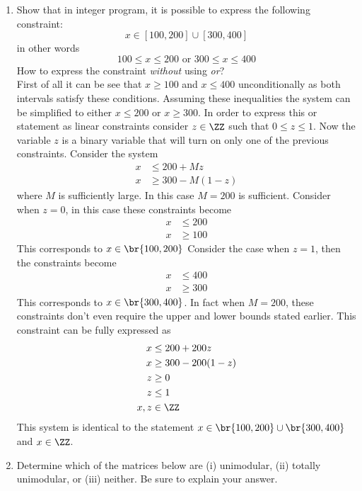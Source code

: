 \documentclass[11pt, oneside]{article}
\begin{document}
\begin{enumerate}
  \item %
    Show that in integer program, it is possible to express the following constraint:
    \[
      x \in [100,200]  \cup [300,400]
    \]
    in other words
    \[
      100 \leq x \leq 200   \text{ or } 300 \leq x \leq 400
    \]
    How to express the constraint \emph{without} using \emph{or}?\\

    First of all it can be see that $x \ge 100$ and $x \le 400$ unconditionally
    as both intervals satisfy these conditions.
    Assuming these inequalities the system can be simplified to
    either $x \le 200$ or $x \ge 300$.
    In order to express this or statement as linear constraints consider
    $z \in \ZZ$ such that $0 \le z \le 1$.
    Now the variable $z$ is a binary variable that will turn on only one
    of the previous constraints.
    Consider the system
    \begin{align*}
      x &\le 200 + Mz \\
      x &\ge 300 - M(1 - z)
    \end{align*}
    where $M$ is sufficiently large.
    In this case $M = 200$ is sufficient.
    Consider when $z = 0$, in this case these constraints become
    \begin{align*}
      x &\le 200 \\
      x &\ge 100
    \end{align*}
    This corresponds to $x \in \br{100, 200}$
    Consider the case when $z = 1$, then the constraints become
    \begin{align*}
      x &\le 400 \\
      x &\ge 300
    \end{align*}
    This corresponds to $x \in \br{300, 400}$.
    In fact when $M = 200$, these constraints don't even require the upper and
    lower bounds stated earlier.
    This constraint can be fully expressed as
    \begin{align*}
      x &\le 200 + 200z \\
      x &\ge 300 - 200(1 - z) \\
      z &\ge 0 \\
      z &\le 1 \\
      x, z &\in \ZZ
    \end{align*}
    This system is identical to the statement
    $x \in \br{100, 200} \cup \br{300, 400}$ and $x \in \ZZ$.

  \item %
    Determine which of the matrices below are (i) unimodular, (ii) totally
    unimodular, or (iii) neither.
    Be sure to explain your answer.


\end{enumerate}
\end{document}
